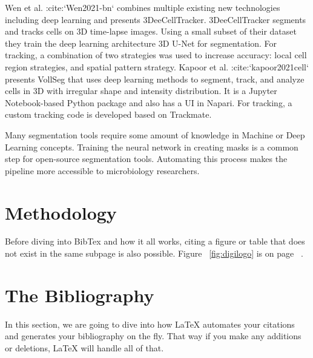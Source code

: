\documentclass[./dissertation.tex]{subfiles}
\begin{document}
Wen et al. :cite:`Wen2021-bn` combines multiple existing new technologies including deep learning and presents 3DeeCellTracker. 3DeeCellTracker segments and tracks cells on 3D time-lapse images. Using a small subset of their dataset they train the deep learning architecture 3D U-Net for segmentation. For tracking, a combination of two strategies was used to increase accuracy: local cell region strategies, and spatial pattern strategy. Kapoor et al. :cite:`kapoor2021cell` presents VollSeg that uses deep learning methods to segment, track, and analyze cells in 3D with irregular shape and intensity distribution. It is a Jupyter Notebook-based Python package and also has a UI in Napari. For tracking, a custom tracking code is developed based on Trackmate.

Many segmentation tools require some amount of knowledge in Machine or Deep Learning concepts. Training the neural network in creating masks is a common step for open-source segmentation tools. Automating this process makes the pipeline more accessible to microbiology researchers.

\section{Methodology}



















    Before diving into BibTex and how it all works, citing a figure or table that does not exist in the same subpage is also possible. Figure ~\ref{fig:digilogo} is on page ~\pageref{fig:digilogo}.
    \section{The Bibliography}
      In this section, we are going to dive into how LaTeX automates your citations and generates your bibliography on the fly. That way if you make any additions or deletions, LaTeX will handle all of that.
\end{document}
